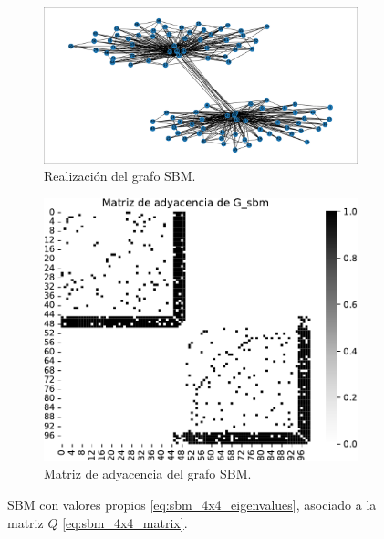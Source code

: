 \documentclass{article}
\begin{document}
\begin{figure}[htb]
    \centering
    \begin{subfigure}{0.8\textwidth}
        \centering
        \includegraphics[width=\linewidth]{images/sbm/sbm_4n.pdf}
        \caption{Realización del grafo SBM.}
        \label{fig:sbm_4x4_eigenvalues}
    \end{subfigure}
    \par\bigskip
    \begin{subfigure}{0.6\textwidth}
        \centering
        \includegraphics[width=\linewidth]{images/sbm/sbm_4n_adj_matrix.pdf}
        \caption{Matriz de adyacencia del grafo SBM.}
        \label{fig:sbm_4x4_adj_matrix}
    \end{subfigure}
    \caption{SBM con valores propios \eqref{eq:sbm_4x4_eigenvalues}, asociado a la matriz $Q$ \eqref{eq:sbm_4x4_matrix}.}
    \label{fig:sbm_4x4_generation}
\end{figure}
\end{document}
